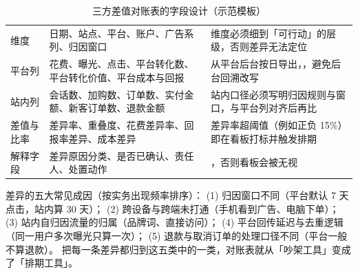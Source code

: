 \begin{table}[htbp]
\centering
\caption{三方差值对账表的字段设计（示范模板）}
\label{tab:growth-recon}
\small
\begin{tabularx}{\textwidth}{L{2.5cm} L{4.0cm} Y}
\toprule
{} &  &  \\
\midrule
维度 & 日期、站点、平台、账户、广告系列、归因窗口 & 维度必须细到「可行动」的层级，否则差异无法定位 \\
\addlinespace
平台列 & 花费、曝光、点击、平台转化数、平台转化价值、平台成本与回报 & 从平台后台按日导出，，避免后台回溯改写 \\
\addlinespace
站内列 & 会话数、加购数、订单数、实付金额、新客订单数、退款金额 & 站内口径必须写明归因规则与窗口，与平台列对齐后再比 \\
\addlinespace
差值与比率 & 差异率、重叠度、花费差异率、回报率差异、成本差异 & 差异率超阈值（例如正负 15\%）即在看板打标并触发排期 \\
\addlinespace
解释字段 & 差异原因分类、是否已确认、责任人、处置动作 & ，否则看板会被无视 \\
\bottomrule
\end{tabularx}
\end{table}

差异的五大常见成因（按实务出现频率排序）：
(1) 归因窗口不同（平台默认 7 天点击，站内算 30 天）；
(2) 跨设备与跨端未打通（手机看到广告、电脑下单）；
(3) 站内自归因流量的归属（品牌词、直接访问）；
(4) 平台回传延迟与去重逻辑（同一用户多次曝光只算一次）；
(5) 退款与取消订单的处理口径不同（平台一般不算退款）。
把每一条差异都归到这五类中的一类，对账表就从「吵架工具」变成了「排期工具」。

